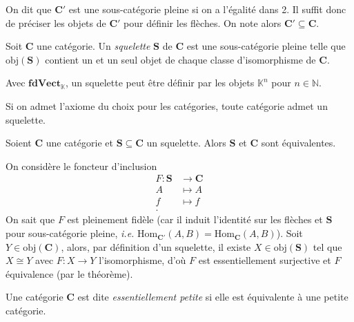 \begin{note}
  On dit que $\mathbf{C}'$ est une sous-catégorie pleine si on a l'égalité dans 2.
  Il suffit donc de préciser les objets de $\mathbf{C}'$ pour définir les flèches.
  On note alors $\mathbf{C}' \subseteq \mathbf{C}$.
\end{note}

\begin{defn}[Squelette]
  Soit $\mathbf{C}$ une catégorie.
  Un \textit{squelette} $\mathbf{S}$ de $\mathbf{C}$ est une sous-catégorie pleine telle que $\mathrm{obj}(\mathbf{S})$ contient un et un seul objet de chaque classe d'isomorphisme de $\mathbf{C}$.
\end{defn}

\begin{exm}
  Avec $\mathbf{fdVect}_\mathds{K}$, un squelette peut être définir par les objets $\mathds{K}^n$ pour $n \in \mathds{N}$.
\end{exm}

\begin{exm}
  Si on admet l'axiome du choix pour les catégories, toute catégorie admet un squelette.
\end{exm}

\begin{prop}
  Soient $\mathbf{C}$ une catégorie et $\mathbf{S} \subseteq \mathbf{C}$ un squelette.
  Alors $\mathbf{S}$ et $\mathbf{C}$ sont équivalentes.
\end{prop}

\begin{prv}
  On considère le foncteur d'inclusion 
  \begin{align*}
    F : \mathbf{S} &\longrightarrow \mathbf{C} \\
    A &\longmapsto A\\
    f &\longmapsto f\\
  .\end{align*}
  On sait que $F$ est pleinement fidèle (car il induit l'identité sur les flèches et $\mathbf{S}$ pour sous-catégorie pleine, \textit{i.e.} $\mathrm{Hom}_{\mathbf{C}'}(A,B) = \mathrm{Hom}_{\mathbf{C}}(A,B)$).
  Soit $Y \in \mathrm{obj}(\mathbf{C})$, alors, par définition d'un squelette, il existe $X \in \mathrm{obj}(\mathbf{S})$ tel que $X \cong Y$ avec $F : X \to Y$ l'isomorphisme, d'où $F$ est essentiellement surjective et $F$ équivalence (par le théorème).
\end{prv}

\begin{defn}
  Une catégorie $\mathbf{C}$ est dite \textit{essentiellement petite} si elle est équivalente à une petite catégorie.
\end{defn}

